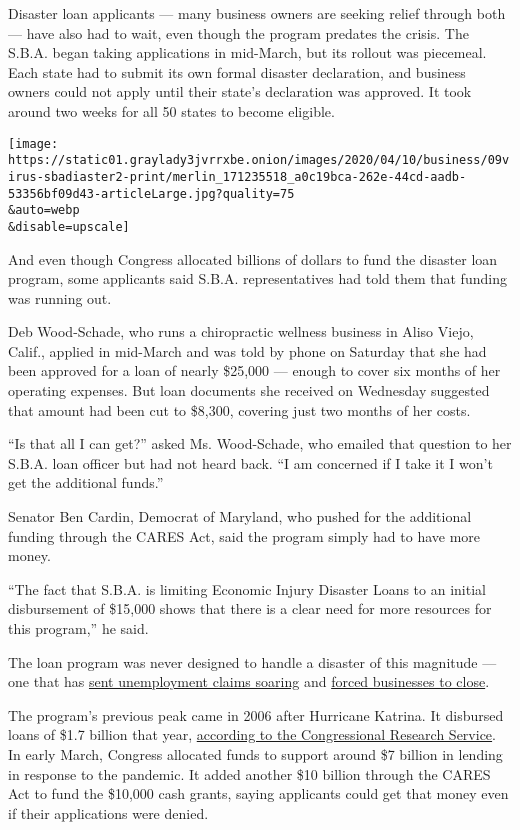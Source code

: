 Disaster loan applicants --- many business owners are seeking relief
through both --- have also had to wait, even though the program predates
the crisis. The S.B.A. began taking applications in mid-March, but its
rollout was piecemeal. Each state had to submit its own formal disaster
declaration, and business owners could not apply until their state's
declaration was approved. It took around two weeks for all 50 states to
become eligible.

\texttt{[image: https://static01.graylady3jvrrxbe.onion/images/2020/04/10/business/09virus-sbadiaster2-print/merlin\_171235518\_a0c19bca-262e-44cd-aadb-53356bf09d43-articleLarge.jpg?quality=75\\\&auto=webp\\\&disable=upscale]}

And even though Congress allocated billions of dollars to fund the
disaster loan program, some applicants said S.B.A. representatives had
told them that funding was running out.

Deb Wood-Schade, who runs a chiropractic wellness business in Aliso
Viejo, Calif., applied in mid-March and was told by phone on Saturday
that she had been approved for a loan of nearly \$25,000 --- enough to
cover six months of her operating expenses. But loan documents she
received on Wednesday suggested that amount had been cut to \$8,300,
covering just two months of her costs.

``Is that all I can get?'' asked Ms. Wood-Schade, who emailed that
question to her S.B.A. loan officer but had not heard back. ``I am
concerned if I take it I won't get the additional funds.''

Senator Ben Cardin, Democrat of Maryland, who pushed for the additional
funding through the CARES Act, said the program simply had to have more
money.

``The fact that S.B.A. is limiting Economic Injury Disaster Loans to an
initial disbursement of \$15,000 shows that there is a clear need for
more resources for this program,'' he said.

The loan program was never designed to handle a disaster of this
magnitude --- one that has
\href{https://www.nytimes3xbfgragh.onion/2020/04/09/business/economy/unemployment-claim-numbers-coronavirus.html}{sent
unemployment claims soaring} and
\href{https://www.nytimes3xbfgragh.onion/2020/04/06/business/economy/coronavirus-economy.html}{forced
businesses to close}.

The program's previous peak came in 2006 after Hurricane Katrina. It
disbursed loans of \$1.7 billion that year,
\href{https://fas.org/sgp/crs/misc/R43846.pdf}{according to the
Congressional Research Service}. In early March, Congress allocated
funds to support around \$7 billion in lending in response to the
pandemic. It added another \$10 billion through the CARES Act to fund
the \$10,000 cash grants, saying applicants could get that money even if
their applications were denied.

